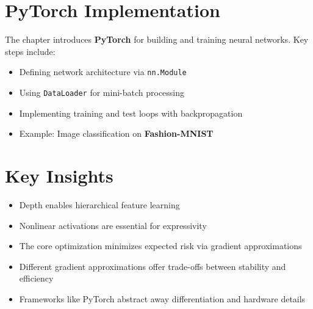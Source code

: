 \begin{notechapter}
\section{PyTorch Implementation}
The chapter introduces \textbf{PyTorch} for building and training neural networks. Key steps include:
\begin{itemize}
    \item Defining network architecture via \texttt{nn.Module}
    \item Using \texttt{DataLoader} for mini-batch processing
    \item Implementing training and test loops with backpropagation
    \item Example: Image classification on \textbf{Fashion-MNIST}
\end{itemize}

\section{Key Insights}
\begin{itemize}
    \item Depth enables hierarchical feature learning
    \item Nonlinear activations are essential for expressivity
    \item The core optimization minimizes expected risk via gradient approximations
    \item Different gradient approximations offer trade-offs between stability and efficiency
    \item Frameworks like PyTorch abstract away differentiation and hardware details
\end{itemize}
\end{notechapter}
